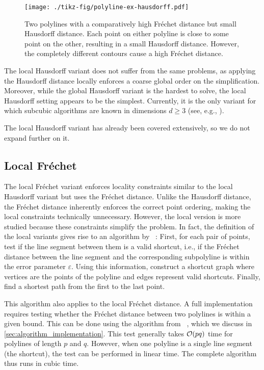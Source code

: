 \begin{figure}[b]
  \centering
  \texttt{[image: ./tikz-fig/polyline-ex-hausdorff.pdf]}
  \caption{Two polylines with a comparatively high Fréchet distance but small Hausdorff distance. Each point on either polyline is close to some point on the other, resulting in a small Hausdorff distance. However, the completely different contours cause a high Fréchet distance.}
  \label{fig:polyline-ex-hausdorff}
\end{figure}

The local Hausdorff variant does not suffer from the same problems, as applying the Hausdorff distance locally enforces a coarse global order on the simplification. Moreover, while the global Hausdorff variant is the hardest to solve, the local Hausdorff setting appears to be the simplest. Currently, it is the only variant for which subcubic algorithms are known in dimensions \(d \geq 3\) (see, e.g., \cite{efficiently_approximating_higher_dim}).

The local Hausdorff variant has already been covered extensively, so we do not expand further on it.

\subsection{Local Fréchet}
The local Fréchet variant enforces locality constraints similar to the local Hausdorff variant but uses the Fréchet distance. Unlike the Hausdorff distance, the Fréchet distance inherently enforces the correct point ordering, making the local constraints technically unnecessary. However, the local version is more studied because these constraints simplify the problem. In fact, the definition of the local variants gives rise to an algorithm by \citeauthor{computational_geometric_methods_for_polygonal_approximations_of_a_curve}~\cite{computational_geometric_methods_for_polygonal_approximations_of_a_curve}: First, for each pair of points, test if the line segment between them is a valid shortcut, i.e., if the Fréchet distance between the line segment and the corresponding subpolyline is within the error parameter \(\varepsilon\). Using this information, construct a shortcut graph where vertices are the points of the polyline and edges represent valid shortcuts. Finally, find a shortest path from the first to the last point.

This algorithm also applies to the local Fréchet distance. A full implementation requires testing whether the Fréchet distance between two polylines is within a given bound. This can be done using the algorithm from \citeauthor{computing_the_frechet_distance_between_two_polygonal_curves}~\cite{computing_the_frechet_distance_between_two_polygonal_curves}, which we discuss in \cref{sec:algorithm_implementation}. This test generally takes \(\mathcal{O}(pq)\) time for polylines of length \(p\) and \(q\). However, when one polyline is a single line segment (the shortcut), the test can be performed in linear time. The complete algorithm thus runs in cubic time.

